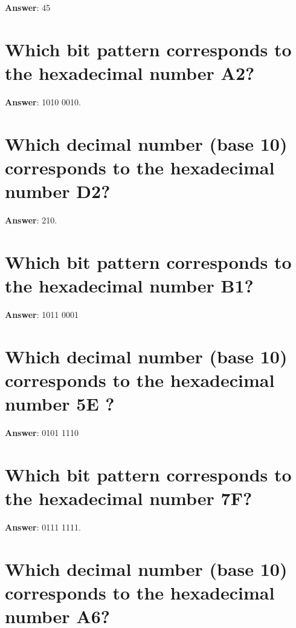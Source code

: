 \documentclass[a4paper,11pt,oneside]{book}
\begin{document}
\begin{sloppypar}
\label{q:395:sa:en:True}

\textbf{Answer}: 45



\section{Which bit pattern corresponds to the hexadecimal number A2?}

\label{q:396:sa:en:True}

\textbf{Answer}: 1010 0010.



\section{Which decimal number (base 10) corresponds to the hexadecimal number D2?}

\label{q:397:sa:en:True}

\textbf{Answer}: 210.



\section{Which bit pattern corresponds to the hexadecimal number B1?}

\label{q:398:sa:en:True}

\textbf{Answer}: 1011 0001



\section{Which decimal number (base 10) corresponds to the hexadecimal number  5E ?}

\label{q:399:sa:en:True}

\textbf{Answer}: 0101 1110



\section{Which bit pattern corresponds to the hexadecimal number 7F?}

\label{q:400:sa:en:True}

\textbf{Answer}: 0111 1111.



\section{Which decimal number (base 10) corresponds to the hexadecimal number  A6?}


\end{sloppypar}
\end{document}
